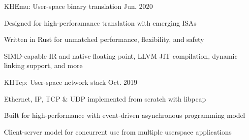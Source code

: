 

\begin{cventries}

  \cventry
    {KHEmu: User-space binary translation}
    {}{}
    {Jun. 2020} %
    {
      \begin{cvitems} %
        \item {Designed for high-perforamance translation with emerging ISAs}
        \item {Written in Rust for unmatched performance, flexibility, and safety}
        \item {SIMD-capable IR and native floating point, LLVM JIT compilation, dynamic linking support, and more}
      \end{cvitems}
    }

    \begin{comment}
  \cventry
    {RISC-V experiment platform on Zynq UltraScale+ MPSoC} %
    {}{}
    {Jan. 2020} %
    {
      \begin{cvitems} %
        \item {Renowned Rocket Chip from UCB implemented on FPGA, tailored for computer architecture research}
        \item {Flexible framework for baremetal or Linux-based software projects}
        \item {High-speed debugging based on coherent memories and GPIO JTAG}
      \end{cvitems}
    }
    \end{comment}

  \cventry
    {KHTcp: User-space network stack} %
    {}{}
    {Oct. 2019} %
    {
        \begin{cvitems} %
        \item {Ethernet, IP, TCP \& UDP implemented from scratch with libpcap}
        \item {Built for high-performance with event-driven asynchronous programming model}
        \item {Client-server model for concurrent use from multiple userspace applications}
        \end{cvitems}
    }

\end{cventries}
